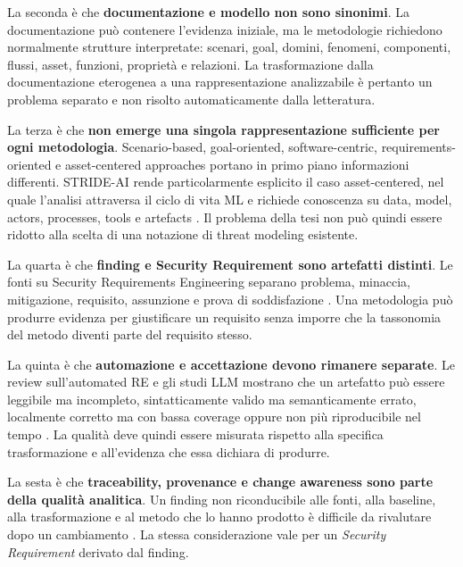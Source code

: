 \documentclass[12pt,a4paper,oneside]{report}
\newcommand{\securityrequirement}{\textit{Security Requirement}}
\begin{document}
La seconda è che \textbf{documentazione e modello non sono sinonimi}. La documentazione può contenere l'evidenza iniziale, ma le metodologie richiedono normalmente strutture interpretate: scenari, goal, domini, fenomeni, componenti, flussi, asset, funzioni, proprietà e relazioni. La trasformazione dalla documentazione eterogenea a una rappresentazione analizzabile è pertanto un problema separato e non risolto automaticamente dalla letteratura.

La terza è che \textbf{non emerge una singola rappresentazione sufficiente per ogni metodologia}. Scenario-based, goal-oriented, software-centric, requirements-oriented e asset-centered approaches portano in primo piano informazioni differenti. STRIDE-AI rende particolarmente esplicito il caso asset-centered, nel quale l'analisi attraversa il ciclo di vita ML e richiede conoscenza su data, model, actors, processes, tools e artefacts \citep{mauri2022strideai}. Il problema della tesi non può quindi essere ridotto alla scelta di una notazione di threat modeling esistente.

La quarta è che \textbf{finding e Security Requirement sono artefatti distinti}. Le fonti su Security Requirements Engineering separano problema, minaccia, mitigazione, requisito, assunzione e prova di soddisfazione \citep{sindre2005eliciting,haley2008securityrequirements,hatebur2006securityengineering}. Una metodologia può produrre evidenza per giustificare un requisito senza imporre che la tassonomia del metodo diventi parte del requisito stesso.

La quinta è che \textbf{automazione e accettazione devono rimanere separate}. Le review sull'automated RE e gli studi LLM mostrano che un artefatto può essere leggibile ma incompleto, sintatticamente valido ma semanticamente errato, localmente corretto ma con bassa coverage oppure non più riproducibile nel tempo \citep{umar2024automatedrequirements,ferrari2024modelgeneration,garaccione2025llmcomparison,abualhaija2025regulatory,angermeir2026reproducibility}. La qualità deve quindi essere misurata rispetto alla specifica trasformazione e all'evidenza che essa dichiara di produrre.

La sesta è che \textbf{traceability, provenance e change awareness sono parte della qualità analitica}. Un finding non riconducibile alle fonti, alla baseline, alla trasformazione e al metodo che lo hanno prodotto è difficile da rivalutare dopo un cambiamento \citep{mucha2024prers,grosser2022documentrelations}. La stessa considerazione vale per un \securityrequirement{} derivato dal finding.
\end{document}

